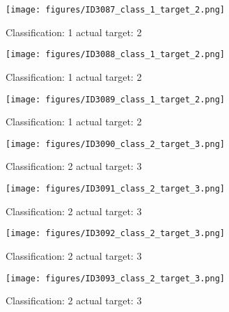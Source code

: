 \begin{figure}[h!]
\begin{center}
\texttt{[image: figures/ID3087\_class\_1\_target\_2.png]}
\end{center}
\caption{ Classification: 1 actual target: 2}
\label{fig:ID3087_class_1_target_2}
\end{figure}
\begin{figure}[h!]
\begin{center}
\texttt{[image: figures/ID3088\_class\_1\_target\_2.png]}
\end{center}
\caption{ Classification: 1 actual target: 2}
\label{fig:ID3088_class_1_target_2}
\end{figure}
\begin{figure}[h!]
\begin{center}
\texttt{[image: figures/ID3089\_class\_1\_target\_2.png]}
\end{center}
\caption{ Classification: 1 actual target: 2}
\label{fig:ID3089_class_1_target_2}
\end{figure}
\begin{figure}[h!]
\begin{center}
\texttt{[image: figures/ID3090\_class\_2\_target\_3.png]}
\end{center}
\caption{ Classification: 2 actual target: 3}
\label{fig:ID3090_class_2_target_3}
\end{figure}
\begin{figure}[h!]
\begin{center}
\texttt{[image: figures/ID3091\_class\_2\_target\_3.png]}
\end{center}
\caption{ Classification: 2 actual target: 3}
\label{fig:ID3091_class_2_target_3}
\end{figure}
\begin{figure}[h!]
\begin{center}
\texttt{[image: figures/ID3092\_class\_2\_target\_3.png]}
\end{center}
\caption{ Classification: 2 actual target: 3}
\label{fig:ID3092_class_2_target_3}
\end{figure}
\begin{figure}[h!]
\begin{center}
\texttt{[image: figures/ID3093\_class\_2\_target\_3.png]}
\end{center}
\caption{ Classification: 2 actual target: 3}
\label{fig:ID3093_class_2_target_3}
\end{figure}
